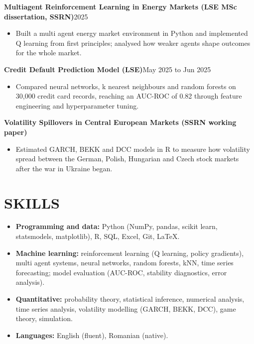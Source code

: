 \documentclass[a4paper,11pt]{article}
\newcommand{\entry}[2]{\vspace{2pt}\noindent\textbf{#1}\hfill #2\par\vspace{1pt}}
\newenvironment{pts}{\begin{itemize}[leftmargin=0.2in,label=\textbullet,topsep=1pt,itemsep=1pt,parsep=0pt]}{\end{itemize}\vspace{-2pt}}
\begin{document}
\entry{Multiagent Reinforcement Learning in Energy Markets \textmd{(LSE MSc dissertation, SSRN)}}{2025}
\begin{pts}
  \item Built a multi agent energy market environment in Python and implemented Q learning from first principles; analysed how weaker agents shape outcomes for the whole market.
\end{pts}

\entry{Credit Default Prediction Model \textmd{(LSE)}}{May 2025 to Jun 2025}
\begin{pts}
  \item Compared neural networks, k nearest neighbours and random forests on 30,000 credit card records, reaching an AUC-ROC of 0.82 through feature engineering and hyperparameter tuning.
\end{pts}

\entry{Volatility Spillovers in Central European Markets \textmd{(SSRN working paper)}}{}
\begin{pts}
  \item Estimated GARCH, BEKK and DCC models in R to measure how volatility spread between the German, Polish, Hungarian and Czech stock markets after the war in Ukraine began.
\end{pts}

\section{SKILLS}
\vspace{2pt}
\begin{pts}
  \item \textbf{Programming and data:} Python (NumPy, pandas, scikit learn, statsmodels, matplotlib), R, SQL, Excel, Git, \LaTeX.
  \item \textbf{Machine learning:} reinforcement learning (Q learning, policy gradients), multi agent systems, neural networks, random forests, kNN, time series forecasting; model evaluation (AUC-ROC,
stability diagnostics, error analysis).
  \item \textbf{Quantitative:} probability theory, statistical inference, numerical analysis, time series analysis, volatility modelling (GARCH, BEKK, DCC), game theory, simulation.
  \item \textbf{Languages:} English (fluent), Romanian (native).
\end{pts}
\end{document}

